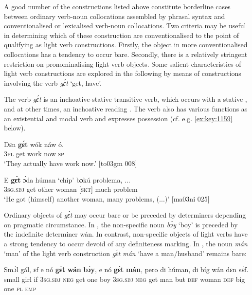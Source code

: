 A good number of the constructions listed above constitute borderline cases between ordinary verb-noun collocations assembled by phrasal syntax and conventionalised or lexicalised verb-noun collocations. Two criteria may be useful in determining which of these construction are conventionalised to the point of qualifying as light verb constructions. Firstly, the object in more conventionalised collocations has a tendency to occur bare. Secondly, there is a relatively stringent restriction on pronominalising light verb objects. Some salient characteristics of light verb constructions are explored in the following by means of constructions involving the verb \textit{gɛ́t} ‘get, have’.


The verb \textit{gɛ́t} is an inchoative-stative transitive verb, which occurs with a stative , and at other times, an inchoative reading . The verb also has various functions as an existential and modal verb and expresses possession{\fff} (cf. e.g. \ref{ex:key:1159} below).



\ea%
    \label{ex:key:1157}
    \gll Dɛn  \textbf{gɛ́t}  wók    náw    ó.\\
\textsc{3pl}  get  work  now    \textsc{sp}\\

\glt ‘They actually have work now.’ [to03gm 008]
\z


\ea%
    \label{ex:key:1158}
    \gll E    \textbf{gɛ́t}  ɔ́da    húman  ‘chíp’  bɔkú  problema,  \op...\cp{}\\
\textsc{3sg.sbj}  get  other  woman  \textsc{[skt]}    much  problem\\

\glt ‘He got (himself) another woman, many problems, (...)’ [ma03ni 025]
\z

Ordinary objects of \textit{gɛ́t} may occur bare or be preceded by determiners depending on pragmatic circumstance. In , the non-specific noun \textit{bɔ́y} ‘boy’ is preceded by the indefinite determiner wán. In contrast, non-specific objects of light verbs have a strong tendency to occur devoid of any definiteness{\fff} marking. In , the noun \textit{mán} ‘man’ of the light verb construction \textit{gɛ́t mán} ‘have a man/husband’ remains bare: 


\ea%
    \label{ex:key:1159}
    \gll Smɔ́l  gál,  ɛf  e    nó  \textbf{gɛ́t}  \textbf{wán}  \textbf{bɔ́y},    e    nó  \textbf{gɛ́t}  \textbf{mán},
pero  di  húman,  di  bíg  wán    dɛn  sɛ́f.\\
small  girl  if  \textsc{3sg.sbj}  \textsc{neg}  get  one  boy    \textsc{3sg.sbj}  \textsc{neg}  get  man
but    \textsc{def}  woman  \textsc{def}  big  one    \textsc{pl}  \textsc{emp}\\

